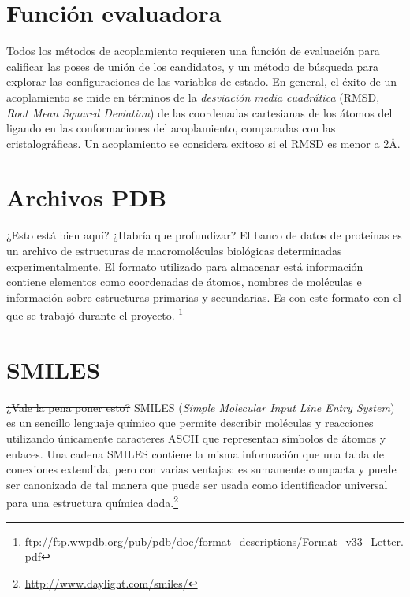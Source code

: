 \section{Función evaluadora}
Todos los métodos de acoplamiento requieren una función de evaluación
para calificar las poses de unión de los candidatos, y un método de
búsqueda para explorar las configuraciones de las variables de
estado. En general, el éxito de un acoplamiento se mide en términos de
la \textit{desviación media cuadrática} (RMSD, \textit{Root Mean
Squared Deviation}) de las coordenadas cartesianas de los átomos del
ligando en las conformaciones del acoplamiento, comparadas con las
cristalográficas. Un acoplamiento se considera exitoso si el RMSD es
menor a 2\AA.

\section{Archivos PDB}
\sout{¿Esto está bien aquí? ¿Habría que profundizar?}
El banco de datos de proteínas es un archivo de estructuras de macromoléculas
biológicas determinadas experimentalmente. El formato utilizado para almacenar
está información contiene elementos como coordenadas de átomos, nombres de
moléculas e información sobre estructuras primarias y secundarias. Es con este
formato con el que se trabajó durante el proyecto.
\footnote{\url{ftp://ftp.wwpdb.org/pub/pdb/doc/format_descriptions/Format_v33_Letter.pdf}}

\section{SMILES}
\sout{¿Vale la pena poner esto?}
SMILES (\textit{Simple Molecular Input Line Entry System}) es un
sencillo lenguaje químico que permite describir moléculas y reacciones
utilizando únicamente caracteres ASCII que representan símbolos de
átomos y enlaces. Una cadena SMILES contiene la misma información que
una tabla de conexiones extendida, pero con varias ventajas: es
sumamente compacta y puede ser canonizada de tal manera que puede ser
usada como identificador universal para una estructura química
dada.\footnote{\url{http://www.daylight.com/smiles/}}
